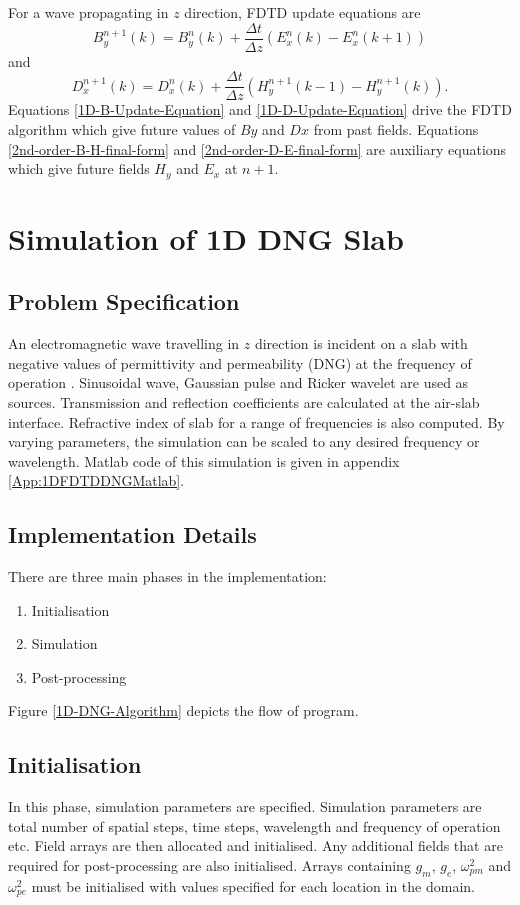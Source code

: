 For a wave propagating in $z$ direction, FDTD update equations are
\begin{equation}
B^{n+1}_y(k)=B^n_y(k)+\dfrac{\Delta t}{\Delta z}\left(E^n_x(k)-E^n_x(k+1)\right)
\label{1D-B-Update-Equation}
\end{equation}
and
\begin{equation}
D^{n+1}_x(k)=D^n_x(k)+\dfrac{\Delta t}{\Delta z}\left(H^{n+1}_y(k-1)-H^{n+1}_y(k)\right).
\label{1D-D-Update-Equation}
\end{equation}
Equations \ref{1D-B-Update-Equation} and \ref{1D-D-Update-Equation} drive the FDTD algorithm which give future values of $By$ and $Dx$ from past fields. Equations \ref{2nd-order-B-H-final-form} and \ref{2nd-order-D-E-final-form} are auxiliary equations which give future fields $H_y$ and $E_x$ at $n+1$.
\section{Simulation of 1D DNG Slab}
\subsection{Problem Specification}
An electromagnetic wave travelling in $z$ direction is incident on a slab with negative values of permittivity and permeability (DNG) at the frequency of operation \cite{DNG-Ehud-Ziol}. Sinusoidal wave, Gaussian pulse and Ricker wavelet are used as sources. Transmission and reflection coefficients are calculated at the air-slab interface. Refractive index of slab for a range of frequencies is also computed. By varying parameters, the simulation can be scaled to any desired frequency or wavelength. Matlab code of this simulation is given in appendix \ref{App:1DFDTDDNGMatlab}.
\subsection{Implementation Details}
There are three main phases in the implementation:
\begin{enumerate}
\item Initialisation
\item Simulation
\item Post-processing
\end{enumerate}
Figure \ref{1D-DNG-Algorithm} depicts the flow of program.
\subsection{Initialisation}
In this phase, simulation parameters are specified. Simulation parameters are total number of spatial steps, time steps, wavelength and frequency of operation etc. Field arrays are then allocated and initialised. Any additional fields that are required for post-processing are also initialised. Arrays containing $g_m$, $g_e$, $\omega^2_{pm}$ and $\omega^2_{pe}$ must be initialised with values specified for each location in the domain.

